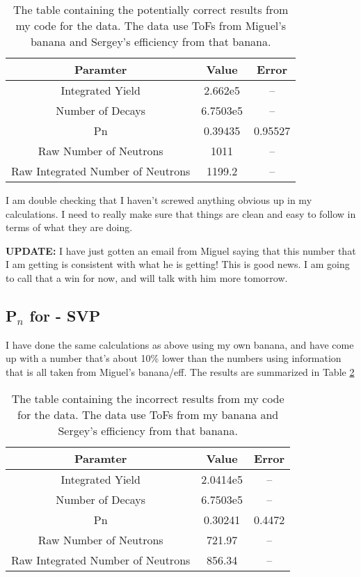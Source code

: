 \begin{table}[htbp]
  \caption{The table containing the potentially correct results from my code 
    for the  data. The data use ToFs from Miguel's banana and 
    Sergey's efficiency from that banana.}
  \label{tbl:ga84-mmf-vast}
  \begin{center}
    \begin{tabular}{|c|c|c|}
      \hline
      Paramter & Value & Error\\\hline
      Integrated Yield & 2.662e5 & --\\\hline
      Number of Decays & 6.7503e5 & --\\\hline
      Pn & 0.39435 & 0.95527\\\hline
      Raw Number of Neutrons & 1011 & --\\\hline
      Raw Integrated Number of Neutrons & 1199.2 & --\\\hline
    \end{tabular}
  \end{center}
\end{table}

I am double checking that I haven't screwed anything obvious up in my 
calculations. I need to really make sure that things are clean and easy to 
follow in terms of what they are doing. 

\textbf{UPDATE: } I have just gotten an email from Miguel saying that this number
that I am getting is consistent with what he is getting! This is good news. I 
am going to call that a win for now, and will talk with him more tomorrow.

\subsection{P$_n$ for  - SVP}
I have done the same calculations as above using my own banana, and have come up
with a number that's about 10\% lower than the numbers using information that 
is all taken from Miguel's banana/eff. The results are summarized in Table 
\ref{tbl:ga84-svp-vast-wrong}
\begin{table}[htbp]
  \caption{The table containing the incorrect results from my code 
    for the  data. The data use ToFs from my banana and 
    Sergey's efficiency from that banana.}
  \label{tbl:ga84-svp-vast-wrong}
  \begin{center}
    \begin{tabular}{|c|c|c|}
      \hline
      Paramter & Value & Error\\\hline
      Integrated Yield & 2.0414e5 & --\\\hline
      Number of Decays & 6.7503e5 & --\\\hline
      Pn & 0.30241 & 0.4472\\\hline
      Raw Number of Neutrons & 721.97 & --\\\hline
      Raw Integrated Number of Neutrons & 856.34 & --\\\hline
    \end{tabular}
  \end{center}
\end{table}

